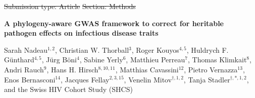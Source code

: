 \documentclass[11pt]{article} %
\providecommand{\DIFdel}[1]{{\protect\color{red}\sout{#1}}}                      %
\providecommand{\DIFdelbegin}{} %
\providecommand{\DIFdelend}{} %
\newcommand{\DIFscaledelfig}{0.5}
\newlength{\DIFdelgraphicswidth} %
\newlength{\DIFdelgraphicsheight} %
\newcommand{\DIFdelincludegraphics}[2][]{%
\sbox{\DIFdelgraphicsbox}{\DIFOincludegraphics[#1]{#2}}%
\settoboxwidth{\DIFdelgraphicswidth}{\DIFdelgraphicsbox} %
\settoboxtotalheight{\DIFdelgraphicsheight}{\DIFdelgraphicsbox} %
\scalebox{\DIFscaledelfig}{%
\parbox[b]{\DIFdelgraphicswidth}{\usebox{\DIFdelgraphicsbox}\\[-\baselineskip] \rule{\DIFdelgraphicswidth}{0em}}\llap{\resizebox{\DIFdelgraphicswidth}{\DIFdelgraphicsheight}{%
\setlength{\unitlength}{\DIFdelgraphicswidth}%
\begin{picture}(1,1)%
\thicklines\linethickness{2pt} %
{\color[rgb]{1,0,0}\put(0,0){\framebox(1,1){}}}%
{\color[rgb]{1,0,0}\put(0,0){\line( 1,1){1}}}%
{\color[rgb]{1,0,0}\put(0,1){\line(1,-1){1}}}%
\end{picture}%
}\hspace*{3pt}}} %
} %
\DeclareRobustCommand{\DIFdelbegin}{\DIFOdelbegin \let\includegraphics\DIFdelincludegraphics} %
\DeclareRobustCommand{\DIFdelend}{\DIFOaddend \let\includegraphics\DIFOincludegraphics} %
\begin{document}
\DIFdelbegin %
\DIFdel{Submission type: Article}%
\DIFdel{Section: Methods
}%
\DIFdelend %

\begin{center}
	\Large{\textbf{A phylogeny-aware GWAS framework to correct for heritable pathogen effects on infectious disease traits}}
\end{center}
\vspace{4pt}

\begin{flushleft}
	Sarah Nadeau$^{1,2}$, Christian W. Thorball$^{3}$, Roger Kouyos$^{4,5}$, Huldrych F. Günthard$^{4,5}$, Jürg Böni$^{4}$, Sabine Yerly$^6$, Matthieu Perreau$^{7}$, Thomas Klimkait$^{8}$, Andri Rauch$^{9}$, Hans H. Hirsch$^{8,10,11}$, Matthias Cavassini$^{12}$, Pietro Vernazza$^{13}$, Enos Bernasconi$^{14}$, Jacques Fellay$^{2,3,15}$, Venelin Mitov$^{\dagger,1,2}$, Tanja Stadler$^{\dagger,\ast,1,2}$, and the Swiss HIV Cohort Study (SHCS)
\end{flushleft}
\end{document}
